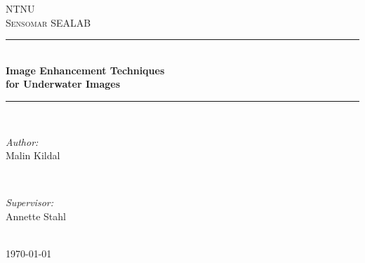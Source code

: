 \documentclass[11pt]{article}
\begin{document}
\begin{titlepage}

\newcommand{\HRule}{\rule{\linewidth}{0.5mm}}
\center

\textsc{\LARGE NTNU}\\[1.0cm]
\textsc{\LARGE Sensomar SEALAB}\\[3.0cm]

\HRule \\[0.5cm]
{ \huge \bfseries Image Enhancement Techniques \\
for Underwater Images}\\[0.5cm]
\HRule \\[3.0cm]

\begin{minipage}{0.4\textwidth}
\begin{flushleft} \large
\emph{Author:}\\
Malin Kildal
\end{flushleft}
\end{minipage}
~
\begin{minipage}{0.4\textwidth}
\begin{flushright} \large
\emph{Supervisor:} \\
Annette Stahl
\end{flushright}
\end{minipage}\\[6cm]

{\large \today}\\[1cm]

\end{titlepage}
\end{document}
